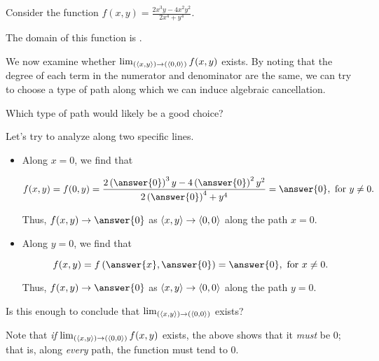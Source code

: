 \documentclass{ximera}
\author{Jim Talamo}
\begin{document}
\begin{exercise}
 
Consider the function $f(x,y) = \frac{2x^3y-4x^2y^2}{2x^4+y^4}$.

The domain of this function is .

We now examine whether $\lim_{\left(\left\langle x,y\right\rangle\right) \to \left(\left\langle 0,0\right\rangle\right)} f(x,y)$ exists.  By noting that the degree of each term in the numerator and denominator are the same, we can try to choose a type of path along which we can induce algebraic cancellation.

Which type of path would likely be a good choice?

\begin{multipleChoice}
\end{multipleChoice}

\begin{exercise}
Let's try to analyze along two specific lines.

\begin{itemize}
\item Along $x=0$, we find that 

\[
f(x,y) = f(0,y) =\frac{2\left(\answer{0}\right)^3y-4\left(\answer{0}\right)^2y^2}{2\left(\answer{0}\right)^4+y^4} = \answer{0}, \textrm{ for } y \neq 0.
\]

Thus, $f(x,y) \to \answer{0}$ as $\left\langle x,y\right\rangle \to \left\langle 0,0\right\rangle$ along the path $x=0$.

\item Along $y=0$, we find that 

\[
f(x,y) = f\left(\answer{x},\answer{0}\right) = \answer{0} , \textrm{ for } x \neq 0.
\]

Thus, $f(x,y) \to \answer{0}$ as $\left\langle x,y\right\rangle \to \left\langle 0,0\right\rangle$ along the path $y=0$.
\end{itemize}

Is this enough to conclude that $\lim_{\left(\left\langle x,y\right\rangle\right) \to \left(\left\langle 0,0\right\rangle\right)}$ exists?

\begin{multipleChoice}
\end{multipleChoice}

\begin{exercise}
Note that \emph{if} $\lim_{\left(\left\langle x,y\right\rangle\right) \to \left(\left\langle 0,0\right\rangle\right)} f(x,y)$ exists, the above shows that it \emph{must} be $0$; that is, along \emph{every} path, the function must tend to $0$.


\end{exercise}
\end{exercise}
\end{exercise}
\end{document}
